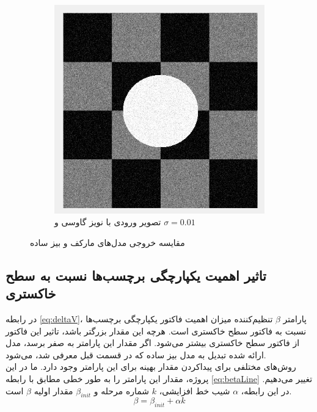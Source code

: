 \documentclass[11.5pt,a4paper]{article}
\begin{document}
\begin{figure}[h]
\begin{subfigure}{0.3\textwidth}
	\end{subfigure}
	\begin{subfigure}{0.3\textwidth}
		\includegraphics[scale=0.3]{Imgs/NB_S01_In.png}
		\caption{تصویر ورودی با نویز گاوسی و $\sigma = 0.01$}
	\end{subfigure}
\caption{مقایسه خروجی‌ مدل‌های مارکف و بیز ساده}
\label{fig:MRF_NB_Comp}
\end{figure}



\subsection{تاثیر اهمیت یکپارچگی برچسب‌ها نسبت به سطح خاکستری}
در رابطه 
\ref{eq:deltaV}،
پارامتر $\beta$ تنظیم‌کننده میزان اهمیت فاکتور یکپارچگی برچسب‌ها نسبت به فاکتور سطح خاکستری است. هرچه این مقدار بزرگتر باشد، تاثیر این فاکتور از فاکتور سطح خاکستری بیشتر می‌شود. اگر مقدار این پارامتر به صفر برسد، مدل ارائه شده تبدیل به مدل بیز ساده که در قسمت قبل معرفی شد، می‌شود. 
\\

روش‌های مختلفی برای پیداکردن مقدار بهینه برای این پارامتر وجود دارد. ما در این پروژه،‌ مقدار این پارامتر را به طور خطی مطابق با رابطه
\ref{eq:betaLine}
تغییر می‌دهیم.
در این رابطه،‌ $\alpha$ شیب خط افزایشی،‌ $k$ شماره مرحله و $\beta_{init}$ مقدار اولیه $\beta$ است.
\begin{equation}
\label{eq:betaLine}
\beta = \beta_{init} + \alpha k
\end{equation}
\end{document}
